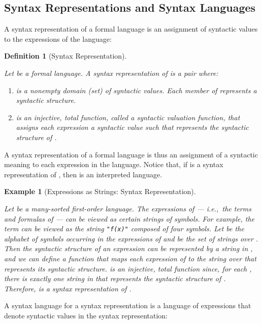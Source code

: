 \documentclass[11pt,fleqn]{article}
\newcommand{\be}{\begin{enumerate}}
\newcommand{\ee}{\end{enumerate}}
\newcommand{\bsp}{\begin{sloppypar}}
\newcommand{\esp}{\end{sloppypar}}
\newtheorem{eg}[thm]{Example}
\newtheorem{df}[thm]{Definition}
\begin{document}
\subsection{Syntax Representations and Syntax Languages}

A syntax representation of a formal language is an assignment of
syntactic values to the expressions of the language:

\begin{df}[Syntax Representation] \label{df:syn-rep} \em \bsp
Let  be a formal language. A \emph{syntax representation} of  is
a pair  where:

\be

  \item  is a nonempty domain (set) of \emph{syntactic
    values}.  Each member of  represents a syntactic
    structure.

  \item  is an injective, total
    function, called a \emph{syntactic valuation function}, that
    assigns each expression  a syntactic value  such that  represents
    the syntactic structure of . \hfill 

\ee 
\esp
\end{df}
A syntax representation of a formal language is thus an assignment of
a syntactic meaning to each expression in the language.  Notice that,
if  is a syntax representation of ,
then  is an interpreted language.

\begin{eg}[Expressions as Strings: Syntax Representation] \label{eg:strings-a} \em \bsp
Let  be a many-sorted first-order language.  The expressions of 
--- i.e.,~the terms and formulas of  --- can be viewed as certain
strings of symbols.  For example, the term  can be viewed as the
string \texttt{"f(x)"} composed of four symbols.  Let  be the
alphabet of symbols occurring in the expressions of  and
 be the set of strings over .  Then the
syntactic structure of an expression can be represented by a string in
, and we can define a function  that maps each expression of  to
the string over  that represents its syntactic structure.   is
an injective, total function since, for each , there is
exactly one string in  that represents the
syntactic structure of .  Therefore,  is a syntax representation of . \hfill  \esp
\end{eg}

A syntax language for a syntax representation is a language of
expressions that denote syntactic values in the syntax representation:
\end{document}
